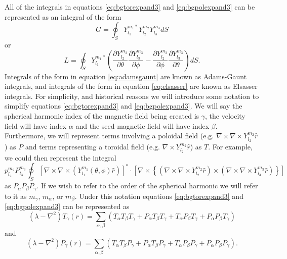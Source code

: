 All of the integrals in equations \ref{eq:bgtorexpand3} and \ref{eq:bgpolexpand3} can be represented as an integral of the form
\begin{equation}
G = \oint_S Y_{l_1}^{m_1*}Y_{l_2}^{m_2}Y_{l_3}^{m_3} dS \label{eq:adamsgaunt}
\end{equation}
or
\begin{equation}
L = \oint_S Y_{l_1}^{m_1*}\left(\frac{\partial
        Y_{l_2}^{m_2}}{\partial \theta}\frac{\partial
        Y_{l_3}^{m_3}}{\partial \phi} - \frac{\partial
        Y_{l_2}^{m_2}}{\partial \phi}\frac{\partial
        Y_{l_3}^{m_3}}{\partial \theta}\right) dS. \label{eq:elsasser}
\end{equation}
Integrals of the form in equation \ref{eq:adamsgaunt} are known as Adams-Gaunt integrals, and integrals of the form in equation \ref{eq:elsasser} are known as Elsasser integrals. For simplicity, and historical reasons we will introduce some notation to simplify equations \ref{eq:bgtorexpand3} and \ref{eq:bgpolexpand3}. We will say the spherical harmonic index of the magnetic field being created is $\gamma$, the velocity field will have index $\alpha$ and the seed magnetic field will have index $\beta$. Furthermore, we will represent terms involving a poloidal field (e.g. $\nabla\times\nabla\times Y_{l_2}^{m_2}\hat{r}$) as $P$ and terms representing a toroidal field (e.g. $\nabla\times Y_{l_2}^{m_2}\hat{r}$) as $T$. For example, we could then represent the integral
\begin{equation}
p_{l_2}^{m_2} P_{l_3}^{m_3} \oint_S \left[\nabla\times\nabla \times (Y_{l_1}^{m_1}(\theta,\phi)\hat{r})\right]^* \cdot
\left[\nabla\times\left\{ \left(\nabla\times\nabla\times Y_{l_2}^{m_2}\hat{r}\right)\times \left(\nabla\times\nabla\times Y_{l_3}^{m_3}\hat{r}\right)   \right\}\right]
\end{equation}
as $P_{\alpha}P_{\beta}P_{\gamma}$. If we wish to refer to the order of the spherical harmonic we will refer to it as $m_\gamma$, $m_\alpha$, or $m_\beta$. Under this notation equations  \ref{eq:bgtorexpand3} and \ref{eq:bgpolexpand3} can be represented as 
\begin{equation}
\left(\lambda-\nabla^{2}\right)T_{\gamma}\left(r\right)=\sum_{\alpha,\beta}\left(T_\alpha T_\beta T_\gamma +P_\alpha T_\beta T_\gamma+T_\alpha P_\beta T_\gamma+P_\alpha P_\beta T_\gamma\right)\label{eq:bgtorexpand4}
\end{equation}
and 
\begin{equation}
\left(\lambda-\nabla^{2}\right)P_{\gamma}\left(r\right)=\sum_{\alpha,\beta}\left(T_\alpha T_\beta P_\gamma +P_\alpha T_\beta P_\gamma+T_\alpha P_\beta P_\gamma+P_\alpha P_\beta P_\gamma\right).\label{eq:bgpolexpand4}
\end{equation}
